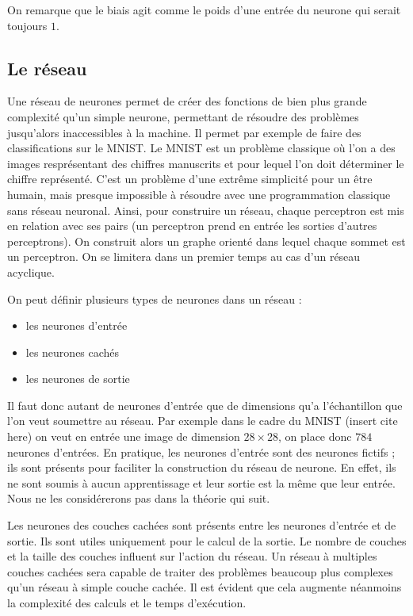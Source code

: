 \medskip

On remarque que le biais agit comme le poids d'une entrée du neurone qui serait
toujours $1$.

\subsection{Le réseau}

Une réseau de neurones permet de créer des fonctions de bien plus grande
complexité qu'un simple neurone, permettant de résoudre des problèmes
jusqu'alors inaccessibles à la machine. Il permet par exemple de faire des
classifications sur le MNIST. Le MNIST est un problème classique où l'on a des
images resprésentant des chiffres manuscrits et pour lequel l'on doit déterminer
 le chiffre représenté. C'est un problème d'une extrême simplicité pour un être
 humain, mais presque impossible à résoudre avec une programmation classique
sans réseau neuronal. Ainsi, pour construire un réseau, chaque perceptron est
mis en relation avec ses pairs (un perceptron prend en entrée les sorties
d'autres perceptrons). On construit alors un graphe orienté dans lequel chaque
sommet est un perceptron. On se limitera dans un premier temps au cas d'un
réseau acyclique.

\bigskip

On peut définir plusieurs types de neurones dans un réseau :
\begin{itemize}
\item les neurones d'entrée
\item les neurones cachés
\item les neurones de sortie
\end{itemize}

\bigskip

Il faut donc autant de neurones d'entrée que de dimensions qu'a l'échantillon
que l'on veut soumettre au réseau. Par exemple dans le cadre du MNIST (insert cite here)
on veut en entrée une image de dimension $28 \times 28$, on place donc $784$
neurones d'entrées. En pratique, les neurones d'entrée sont des neurones fictifs
; ils sont présents pour faciliter la construction du réseau de neurone.
En effet, ils ne sont soumis à aucun apprentissage et leur sortie est la même
que leur entrée. Nous ne les considérerons pas dans la théorie qui suit.

\medskip

Les neurones des couches cachées sont présents entre les neurones d'entrée et de
 sortie. Ils sont utiles uniquement pour le calcul de la sortie. Le nombre de
 couches et la taille des couches influent sur l'action du réseau. Un réseau à
 multiples couches cachées sera capable de traiter des problèmes beaucoup plus
 complexes qu'un réseau à simple couche cachée. Il est évident que cela augmente
  néanmoins la complexité des calculs et le temps d'exécution.

